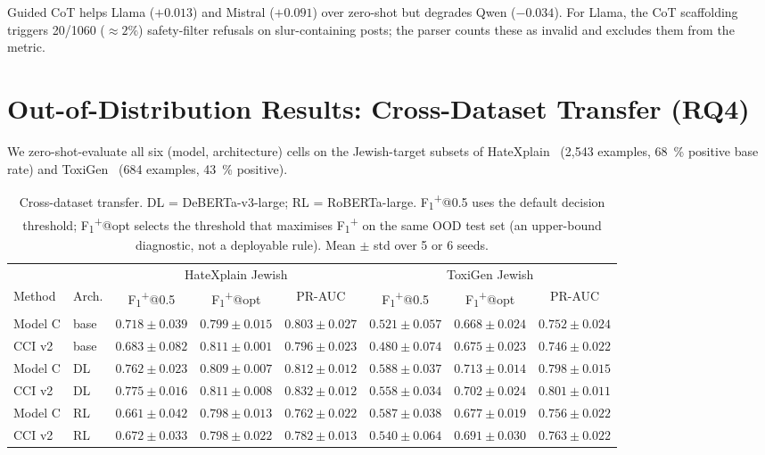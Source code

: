 \documentclass[10pt,a4paper]{article}
\begin{document}
Guided CoT helps Llama (${+}0.013$) and Mistral (${+}0.091$) over zero-shot
but degrades Qwen (${-}0.034$). For Llama, the CoT scaffolding triggers
20/1060 ($\approx 2\%$) safety-filter refusals on slur-containing posts;
the parser counts these as invalid and excludes them from the metric.

\section{Out-of-Distribution Results: Cross-Dataset Transfer (RQ4)}
\label{sec:results-ood}

We zero-shot-evaluate all six (model, architecture) cells on the Jewish-target
subsets of HateXplain~\citep{mathew2021hatexplain} (2{,}543 examples, 68~\%
positive base rate) and ToxiGen~\citep{hartvigsen2022toxigen} (684 examples,
43~\% positive).

\begin{table}[h]
\centering
\small
\begin{tabular}{l l c c c c c c}
\toprule
& & \multicolumn{3}{c}{HateXplain Jewish} & \multicolumn{3}{c}{ToxiGen Jewish} \\
\cmidrule(lr){3-5}\cmidrule(lr){6-8}
Method & Arch. & F\textsubscript{1}\textsuperscript{+}@0.5 & F\textsubscript{1}\textsuperscript{+}@opt & PR-AUC & F\textsubscript{1}\textsuperscript{+}@0.5 & F\textsubscript{1}\textsuperscript{+}@opt & PR-AUC \\
\midrule
Model C  & base  & $\mathbf{0.718}\pm0.039$ & $0.799\pm0.015$           & $\mathbf{0.803}\pm0.027$ & $\mathbf{0.521}\pm0.057$ & $0.668\pm0.024$           & $0.752\pm0.024$ \\
CCI v2   & base  & $0.683\pm0.082$           & $\mathbf{0.811}\pm0.001$ & $0.796\pm0.023$           & $0.480\pm0.074$           & $\mathbf{0.675}\pm0.023$ & $0.746\pm0.022$ \\
Model C  & DL    & $0.762\pm0.023$           & $0.809\pm0.007$           & $0.812\pm0.012$           & $\mathbf{0.588}\pm0.037$ & $\mathbf{0.713}\pm0.014$ & $0.798\pm0.015$ \\
CCI v2   & DL    & $\mathbf{0.775}\pm0.016$ & $\mathbf{0.811}\pm0.008$ & $\mathbf{0.832}\pm0.012$ & $0.558\pm0.034$           & $0.702\pm0.024$           & $\mathbf{0.801}\pm0.011$ \\
Model C  & RL    & $0.661\pm0.042$           & $0.798\pm0.013$           & $0.762\pm0.022$           & $\mathbf{0.587}\pm0.038$ & $0.677\pm0.019$           & $0.756\pm0.022$ \\
CCI v2   & RL    & $\mathbf{0.672}\pm0.033$ & $0.798\pm0.022$           & $\mathbf{0.782}\pm0.013$ & $0.540\pm0.064$           & $\mathbf{0.691}\pm0.030$ & $\mathbf{0.763}\pm0.022$ \\
\bottomrule
\end{tabular}
\caption{Cross-dataset transfer. DL = DeBERTa-v3-large; RL = RoBERTa-large.
F\textsubscript{1}\textsuperscript{+}@0.5 uses the default decision threshold;
F\textsubscript{1}\textsuperscript{+}@opt selects the threshold that maximises
F\textsubscript{1}\textsuperscript{+} on the same OOD test set (an
upper-bound diagnostic, not a deployable rule). Mean $\pm$ std over 5 or 6 seeds.}
\label{tab:xds}
\end{table}
\end{document}
